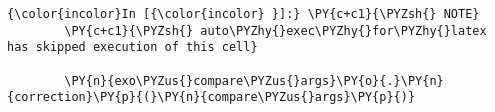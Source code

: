     \begin{Verbatim}[commandchars=\\\{\},frame=single,framerule=0.3mm,rulecolor=\color{cellframecolor}]
{\color{incolor}In [{\color{incolor} }]:} \PY{c+c1}{\PYZsh{} NOTE}
        \PY{c+c1}{\PYZsh{} auto\PYZhy{}exec\PYZhy{}for\PYZhy{}latex has skipped execution of this cell}
        
        \PY{n}{exo\PYZus{}compare\PYZus{}args}\PY{o}{.}\PY{n}{correction}\PY{p}{(}\PY{n}{compare\PYZus{}args}\PY{p}{)}
\end{Verbatim}



    
    
    
